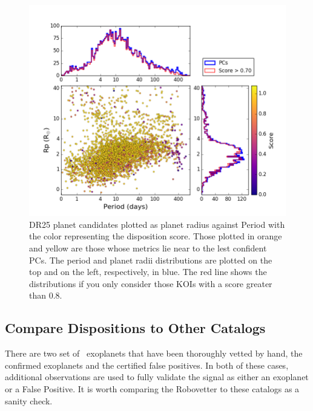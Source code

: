 \begin{figure}
    \centering
    \includegraphics[width=1.1\linewidth]{fig-radiusPeriodScore-hist.png}
    \caption{DR25 planet candidates plotted as planet radius against Period with the color representing the disposition score. Those plotted in orange and yellow are those whose metrics lie near to the lest confident PCs.  The period and planet radii distributions are plotted on the top and on the left, respectively, in blue. The red line shows the distributions if you only consider those KOIs with a score greater than 0.8. }
    \label{f:catalogPlot}
\end{figure}





\subsection{Compare Dispositions to Other Catalogs}
There are two set of \Kepler\ exoplanets that have been thoroughly vetted by hand, the confirmed exoplanets and the certified false positives.  In both of these cases, additional observations are used to fully validate the signal as either an exoplanet or a False Positive. It is worth comparing the Robovetter to these catalogs as a sanity check.  

